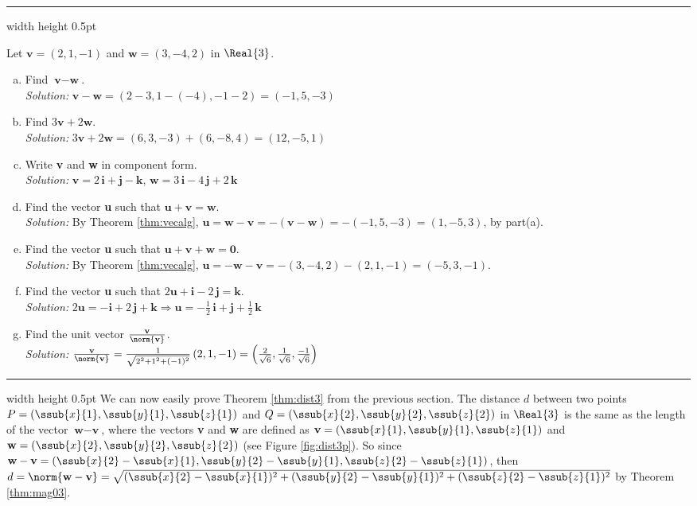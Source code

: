 \hrule width \textwidth height 0.5pt
\begin{exmp}
 Let $\textbf{v} = (2,1,-1)$ and $\textbf{w} = (3,-4,2)$ in $\Real{3}$.
 \begin{enumerate}[(a)]
  \item Find $\textbf{v} - \textbf{w}$.\\\emph{Solution:} $\textbf{v} - \textbf{w} =
   (2 - 3,1 - (-4), -1 - 2) = (-1,5,-3)$
  \item Find $3\textbf{v} + 2\textbf{w}$.\\\emph{Solution:} $3\textbf{v} + 2\textbf{w} = (6,3,-3) + (6,-8,4) =
   (12,-5,1)$
  \item Write \textbf{v} and \textbf{w} in component form.\\\emph{Solution:}
   $\textbf{v} = 2\,\textbf{i} + \textbf{j} - \textbf{k}$, $\textbf{w} = 3\,\textbf{i} - 4\,\textbf{j} + 2\,\textbf{k}$
  \item Find the vector \textbf{u} such that $\textbf{u} + \textbf{v} = \textbf{w}$.\\\emph{Solution:} By Theorem
   \ref{thm:vecalg}, $\textbf{u} = \textbf{w} - \textbf{v} = -(\textbf{v} - \textbf{w}) = -(-1,5,-3) = (1,-5,3)$, by
   part(a).
  \item Find the vector \textbf{u} such that $\textbf{u} + \textbf{v} + \textbf{w} = \textbf{0}$.\\\emph{Solution:}
   By Theorem \ref{thm:vecalg}, $\textbf{u} = -\textbf{w} - \textbf{v} = -(3,-4,2) - (2,1,-1) = (-5,3,-1)$.
  \item Find the vector \textbf{u} such that $2\textbf{u} + \textbf{i} - 2\,\textbf{j} = \textbf{k}$.\\\emph{Solution:}
   $2\textbf{u} = -\textbf{i} + 2\,\textbf{j} + \textbf{k} \Longrightarrow \textbf{u} = -\frac{1}{2}\,\textbf{i} +
  \textbf{j} + \frac{1}{2}\,\textbf{k}$
  \item Find the unit vector $\frac{\textbf{v}}{\norm{\textbf{v}}}$.\\\emph{Solution:}
   $\frac{\textbf{v}}{\norm{\textbf{v}}} = \frac{1}{\sqrt{2^2 + 1^2 + (-1)^2}} \,(2,1,-1) =
   \left ( \frac{2}{\sqrt{6}},\frac{1}{\sqrt{6}},\frac{-1}{\sqrt{6}} \right )$
 \end{enumerate} 
\end{exmp}
\hrule width \textwidth height 0.5pt
\newpage
We can now easily prove Theorem \ref{thm:dist3} from the previous section. The distance $d$ between two
points $P = (\ssub{x}{1},\ssub{y}{1},\ssub{z}{1})$ and $Q = (\ssub{x}{2},\ssub{y}{2},\ssub{z}{2})$ in $\Real{3}$ is the
same as the length of the vector $\textbf{w} - \textbf{v}$, where the vectors \textbf{v} and \textbf{w} are
defined as $\textbf{v} = (\ssub{x}{1},\ssub{y}{1},\ssub{z}{1})$
and $\textbf{w} = (\ssub{x}{2},\ssub{y}{2},\ssub{z}{2})$ (see Figure \ref{fig:dist3p}). So since $\textbf{w} -
\textbf{v} = (\ssub{x}{2} - \ssub{x}{1},\ssub{y}{2} - \ssub{y}{1},\ssub{z}{2} - \ssub{z}{1})$, then
$d = \norm{\textbf{w} - \textbf{v}} = \sqrt{(\ssub{x}{2} - \ssub{x}{1})^2 + (\ssub{y}{2} - \ssub{y}{1})^2 +
(\ssub{z}{2} - \ssub{z}{1})^2}$ by Theorem \ref{thm:mag03}.

